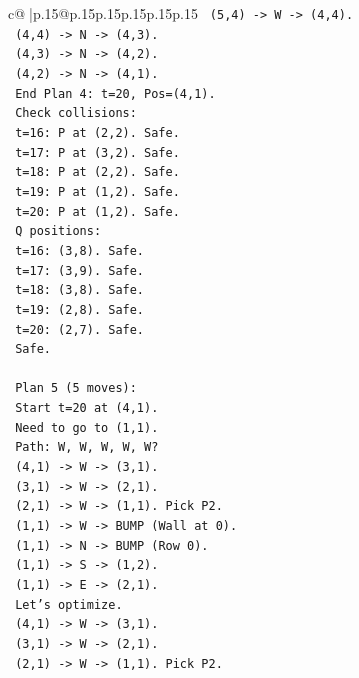 \documentclass{article}
\begin{document}
{\begin{supertabular}{c@{$\;$}|p{.15\linewidth}@{}p{.15\linewidth}p{.15\linewidth}p{.15\linewidth}p{.15\linewidth}p{.15\linewidth}}
{{{\texttt{   (5,4) {-}> W {-}> (4,4).} \\
\texttt{   (4,4) {-}> N {-}> (4,3).} \\
\texttt{   (4,3) {-}> N {-}> (4,2).} \\
\texttt{   (4,2) {-}> N {-}> (4,1).} \\
\texttt{   End Plan 4: t=20, Pos=(4,1).} \\
\texttt{   Check collisions:} \\
\texttt{   t=16: P at (2,2). Safe.} \\
\texttt{   t=17: P at (3,2). Safe.} \\
\texttt{   t=18: P at (2,2). Safe.} \\
\texttt{   t=19: P at (1,2). Safe.} \\
\texttt{   t=20: P at (1,2). Safe.} \\
\texttt{   Q positions:} \\
\texttt{   t=16: (3,8). Safe.} \\
\texttt{   t=17: (3,9). Safe.} \\
\texttt{   t=18: (3,8). Safe.} \\
\texttt{   t=19: (2,8). Safe.} \\
\texttt{   t=20: (2,7). Safe.} \\
\texttt{   Safe.} \\
\\ 
\texttt{   Plan 5 (5 moves):} \\
\texttt{   Start t=20 at (4,1).} \\
\texttt{   Need to go to (1,1).} \\
\texttt{   Path: W, W, W, W, W?} \\
\texttt{   (4,1) {-}> W {-}> (3,1).} \\
\texttt{   (3,1) {-}> W {-}> (2,1).} \\
\texttt{   (2,1) {-}> W {-}> (1,1). Pick P2.} \\
\texttt{   (1,1) {-}> W {-}> BUMP (Wall at 0).} \\
\texttt{   (1,1) {-}> N {-}> BUMP (Row 0).} \\
\texttt{   (1,1) {-}> S {-}> (1,2).} \\
\texttt{   (1,1) {-}> E {-}> (2,1).} \\
\texttt{   Let's optimize.} \\
\texttt{   (4,1) {-}> W {-}> (3,1).} \\
\texttt{   (3,1) {-}> W {-}> (2,1).} \\
\texttt{   (2,1) {-}> W {-}> (1,1). Pick P2.} \\
}}}
\end{supertabular}}
\end{document}
